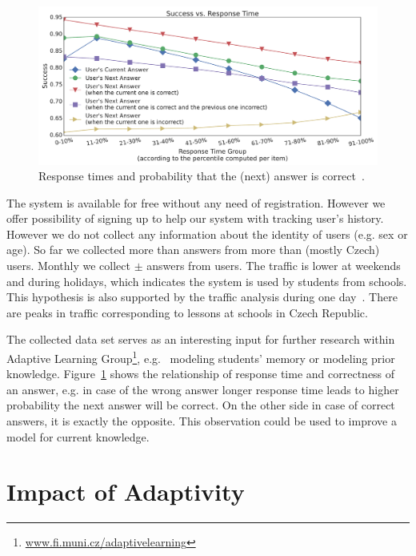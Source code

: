 \documentclass[table,color,cover,twoside,nolot,nolof]{fithesis3/fithesis3}
\begin{document}
\begin{figure}[h]
	\begin{center}
		\includegraphics[width=\textwidth]{figure/response_time}
		\caption{Response times and probability that the (next) answer is correct~\cite{papousek2015analysis}.}
		\label{figure:response_time}
	\end{center}
\end{figure}

The system is available for free without any need of registration. However we
offer possibility of signing up to help our system with tracking user's
history. However we do not collect any information about the identity of users
(e.g. sex or age). So far we collected more than  answers
from more than  (mostly Czech) users. Monthly we collect $\pm$
 answers from  users. The traffic is lower at
weekends and during holidays, which indicates the system is used by students
from schools. This hypothesis is also supported by the traffic analysis during
one day~\cite{stanislav2015factual}. There are peaks in traffic corresponding
to lessons at schools in Czech Republic.

The collected data set serves as an interesting input for further research
within Adaptive Learning Group\footnote{\url{www.fi.muni.cz/adaptivelearning}},
e.g.~\cite{pelanek2015modeling} modeling students' memory or
\cite{niznan2015student} modeling prior knowledge.
Figure~\ref{figure:response_time} shows the relationship of response time and
correctness of an answer, e.g. in case of the wrong answer longer response time
leads to higher probability the next answer will be correct. On the other side
in case of correct answers, it is exactly the opposite. This observation could be
used to improve a model for current knowledge.

\section{Impact of Adaptivity}
\end{document}
